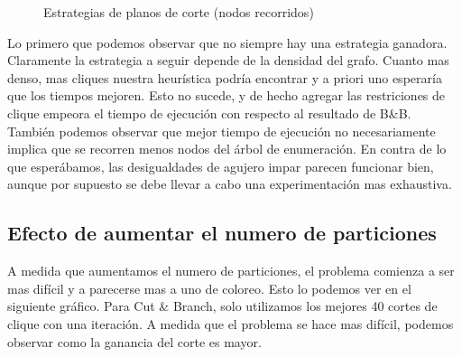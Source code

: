 \begin{figure}[h]
\begin{minipage}[b]{0.49\textwidth}
    \caption{Estrategias de planos de corte (nodos recorridos)}
  \end{minipage}
\end{figure}

Lo primero que podemos observar que no siempre hay una estrategia ganadora. Claramente la estrategia a seguir depende de la densidad del grafo. Cuanto mas denso, mas cliques nuestra heurística podría encontrar y a priori uno esperaría que los tiempos mejoren. Esto no sucede, y de hecho agregar las restriciones de clique empeora el tiempo de ejecución con respecto al resultado de B\&B. También podemos observar que mejor tiempo de ejecución no necesariamente implica que se recorren menos nodos del árbol de enumeración. En contra de lo que esperábamos, las desigualdades de agujero impar parecen funcionar bien, aunque por supuesto se debe llevar a cabo una experimentación mas exhaustiva.

\subsection{Efecto de aumentar el numero de particiones}

A medida que aumentamos el numero de particiones, el problema comienza a ser mas difícil y a parecerse mas a uno de coloreo. Esto lo podemos ver en el siguiente gráfico. Para Cut \& Branch, solo utilizamos los mejores 40 cortes de clique con una iteración. A medida que el problema se hace mas difícil, podemos observar como la ganancia del corte es mayor.

